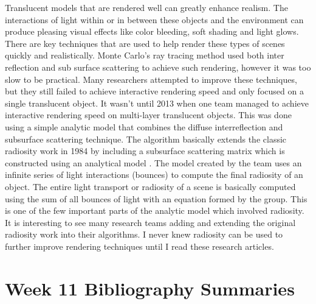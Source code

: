 \documentclass{article}
\begin{document}
Translucent models that are rendered well can greatly enhance realism. The interactions of light within or in between these objects and the environment can produce pleasing visual effects like color bleeding, soft shading and light glows. There are key techniques that are used to help render these types of scenes quickly and realistically. Monte Carlo’s ray tracing method used both inter reflection and sub surface scattering to achieve such rendering, however it was too slow to be practical. Many researchers attempted to improve these techniques, but they still failed to achieve interactive rendering speed and only focused on a single translucent object. It wasn’t until 2013 when one team managed to achieve interactive rendering speed on   multi-layer translucent objects. This was done using a simple analytic model that combines the diffuse interreflection and subsurface scattering technique. The algorithm basically extends the classic radiosity work in 1984 by including a subsurface scattering matrix which is constructed using an analytical model \cite{10.1145/2448196.2448206}. The model created by the team uses an infinite series of light interactions (bounces) to compute the final radiosity of an object. The entire light transport or radiosity of a scene is basically computed using the sum of all bounces of light with an equation formed by the group. This is one of the few important parts of the analytic model which involved radiosity. It is interesting to see many research teams adding and extending the original radiosity work into their algorithms. I never knew radiosity can be used to further improve rendering techniques until I read these research articles. 

\section{Week 11 Bibliography Summaries}
\end{document}
